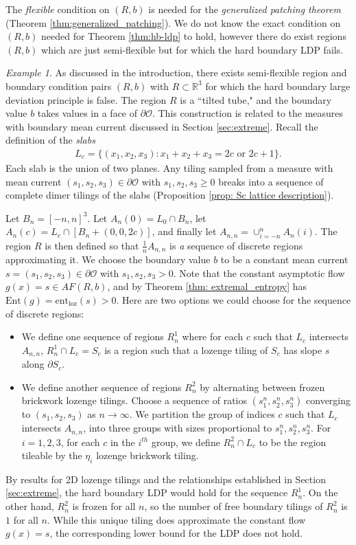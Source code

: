 \documentclass[11pt]{article}
\theoremstyle{remark}
\newtheorem{exmp}[thm]{Example}
\theoremstyle{definition}
\newcommand{\ent}{\text{ent}}
\newcommand{\Ent}{\text{Ent}}
\newcommand{\mc}[1]{\mathcal{#1}}
\newcommand{\m}[1]{\mathbb{#1}}
\begin{document}
The \textit{flexible} condition on $(R,b)$ is needed for the \textit{generalized patching theorem} (Theorem \ref{thm:generalized_patching}). We do not know the exact condition on $(R,b)$ needed for Theorem \ref{thm:hb-ldp} to hold, however there do exist regions $(R,b)$ which are just semi-flexible but for which the hard boundary LDP fails. 
\begin{exmp}\label{ex:hb_false}
    As discussed in the introduction, there exists {semi-flexible} region and boundary condition pairs $(R,b)$ with $R\subset \m R^3$ for which the hard boundary large deviation principle is false. The region $R$ is a ``tilted tube," and the boundary value $b$ takes values in a face of $\partial \mc O$. This construction is related to the measures with boundary mean current discussed in Section \ref{sec:extreme}.
    Recall the definition of the \textit{slabs}
    \begin{align*}
        L_c = \{(x_1,x_2,x_3): x_1 + x_2 + x_3 = 2c \text{ or } 2c+1\}. 
    \end{align*}
    Each slab is the union of two planes. Any tiling sampled from a measure with mean current $(s_1,s_2,s_3)\in \partial \mc O$ with $s_1,s_2,s_3\geq 0$ breaks into a sequence of complete dimer tilings of the slabs (Proposition \ref{prop: Sc lattice description}). 
    
    Let $B_n = [-n,n]^3$. Let $A_n(0) = L_0 \cap B_n$, let $A_n(c) = L_c \cap [B_n+(0,0,2c)]$, and finally let $A_{n,n} = \cup_{i=-n}^n A_n(i)$. The region $R$ is then defined so that $\frac{1}{n} A_{n,n}$ is \textit{a} sequence of discrete regions approximating it. We choose the boundary value $b$ to be a constant mean current $s=(s_1,s_2,s_3)\in \partial \mc O$ with $s_1,s_2,s_3>0$. Note that the constant asymptotic flow $g(x) =s\in AF(R,b)$, and by Theorem \ref{thm: extremal_entropy} has $\Ent(g) = \ent_{\text{loz}}(s)>0$. Here are two options we could choose for the sequence of discrete regions:
    \begin{itemize}
        \item We define one sequence of regions $R_n^1$ where for each $c$ such that $L_c$ intersects $A_{n,n}$, $R_n^1\cap L_c=S_c$ is a region such that a lozenge tiling of $S_c$ has slope $s$ along $\partial S_c$. 
        \item We define another sequence of regions $R_n^2$ by alternating between frozen brickwork lozenge tilings. Choose a sequence of ratios $(s_1^n,s_2^n,s_3^n)$ converging to $(s_1,s_2,s_3)$ as $n\to\infty$. We partition the group of indices $c$ such that $L_c$ intersects $A_{n,n}$, into three groups with sizes proportional to $s_1^n,s_2^n,s_3^n$. For $i=1,2,3$, for each $c$ in the $i^{th}$ group, we define $R_n^2\cap L_c$ to be the region tileable by the $\eta_i$ lozenge brickwork tiling. 
    \end{itemize}
    By results for 2D lozenge tilings and the relationships established in Section \ref{sec:extreme}, the hard boundary LDP would hold for the sequence $R_n^1$. On the other hand, $R_n^2$ is frozen for all $n$, so the number of free boundary tilings of $R_n^2$ is $1$ for all $n$. While this unique tiling does approximate the constant flow $g(x)=s$, the corresponding lower bound for the LDP does not hold.


\end{exmp}
\end{document}
